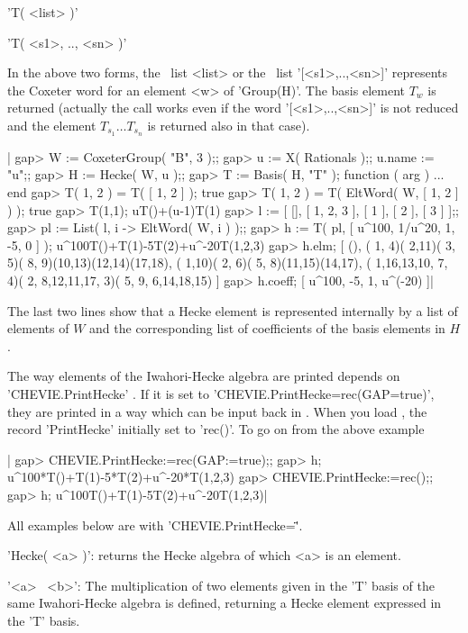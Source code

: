 'T( <list> )'

'T( <s1>, .., <sn> )'

In  the  above two  forms,  the  \GAP\ list  <list>  or  the \GAP\  list
'[<s1>,..,<sn>]'  represents the  Coxeter  word for  an  element <w>  of
'Group(H)'. The basis element $T_w$ is returned (actually the call works
even  if  the word  '[<s1>,..,<sn>]'  is  not  reduced and  the  element
$T_{s_1}\ldots T_{s_n}$ is returned also in that case).

|    gap> W := CoxeterGroup( "B", 3 );;
    gap> u := X( Rationals );; u.name := "u";;
    gap> H := Hecke( W, u );;
    gap> T := Basis( H, "T" );
    function ( arg ) ... end
    gap> T( 1, 2 ) = T( [ 1, 2 ] );
    true
    gap> T( 1, 2 ) = T( EltWord( W, [ 1, 2 ] ) );
    true
    gap> T(1,1);
    uT()+(u-1)T(1)
    gap> l := [ [], [ 1, 2, 3 ], [ 1 ], [ 2 ], [ 3 ] ];;
    gap> pl := List( l, i -> EltWord( W, i ) );;
    gap> h := T( pl, [ u^100, 1/u^20, 1, -5, 0 ] );
    u^100T()+T(1)-5T(2)+u^-20T(1,2,3)
    gap> h.elm;
    [ (), ( 1, 4)( 2,11)( 3, 5)( 8, 9)(10,13)(12,14)(17,18),
      ( 1,10)( 2, 6)( 5, 8)(11,15)(14,17),
      ( 1,16,13,10, 7, 4)( 2, 8,12,11,17, 3)( 5, 9, 6,14,18,15) ]
    gap> h.coeff;
    [ u^100, -5, 1, u^(-20) ]|

The last two lines show that a Hecke element is represented internally by a
list  of elements of $W$ and the  corresponding list of coefficients of the
basis elements in $H$.

The  way  elements  of  the  Iwahori-Hecke  algebra  are printed depends on
'CHEVIE.PrintHecke' . If it is set to
'CHEVIE.PrintHecke\:=rec(GAP\:=true)',  they are printed in a way which can
be  input back  in \GAP.  When you  load {\CHEVIE}, the record 'PrintHecke'
initially set to 'rec()'. To go on from the above example\:

|    gap> CHEVIE.PrintHecke:=rec(GAP:=true);;
    gap> h;
    u^100*T()+T(1)-5*T(2)+u^-20*T(1,2,3)
    gap> CHEVIE.PrintHecke:=rec();;
    gap> h;
    u^100T()+T(1)-5T(2)+u^-20T(1,2,3)|


All examples below are with 'CHEVIE.PrintHecke=\"\"'.

'Hecke( <a> )': returns the Hecke algebra of which <a> is an element.

'<a> \*\ <b>':
The  multiplication of  two elements  given in  the 'T'  basis of  the same
Iwahori-Hecke  algebra is defined,  returning a Hecke  element expressed in
the 'T' basis.

